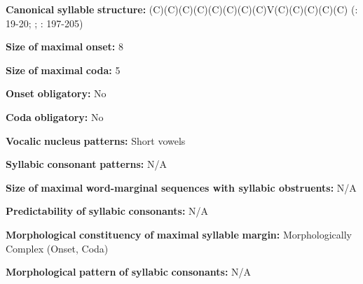 \documentclass[output=paper]{langsci/langscibook}
\begin{document}
\begin{styleBody}
\textbf{Canonical} \textbf{syllable} \textbf{structure:} (C)(C)(C)(C)(C)(C)(C)(C)V(C)(C)(C)(C)(C) (\citealt{Hewitt1995}: 19-20; \citealt{Vogt1958}; \citealt{Butskhrikidze2002}: 197-205)
\end{styleBody}

\begin{styleBody}
\textbf{Size} \textbf{of} \textbf{maximal} \textbf{onset:} 8
\end{styleBody}

\begin{styleBody}
\textbf{Size} \textbf{of} \textbf{maximal} \textbf{coda:} 5
\end{styleBody}

\begin{styleBody}
\textbf{Onset} \textbf{obligatory:} No
\end{styleBody}

\begin{styleBody}
\textbf{Coda} \textbf{obligatory:} No
\end{styleBody}

\begin{styleBody}
\textbf{Vocalic} \textbf{nucleus} \textbf{patterns:} Short vowels
\end{styleBody}

\begin{styleBody}
\textbf{Syllabic} \textbf{consonant} \textbf{patterns:} N/A
\end{styleBody}

\begin{styleBody}
\textbf{Size} \textbf{of} \textbf{maximal} \textbf{word{}-marginal sequences with syllabic obstruents:} N/A
\end{styleBody}

\begin{styleBody}
\textbf{Predictability} \textbf{of} \textbf{syllabic} \textbf{consonants:} N/A
\end{styleBody}

\begin{styleBody}
\textbf{Morphological} \textbf{constituency} \textbf{of} \textbf{maximal} \textbf{syllable} \textbf{margin:} Morphologically Complex (Onset, Coda)
\end{styleBody}

\begin{styleBody}
\textbf{Morphological} \textbf{pattern} \textbf{of} \textbf{syllabic} \textbf{consonants:} N/A
\end{styleBody}
\end{document}
